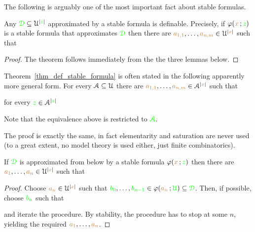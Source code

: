 \documentclass[creche.tex]{subfiles}
\begin{document}
The following is arguably one of the most important fact about stable formulas.

\begin{theorem}\label{thm_def_stable_formula}
Any ${\color{green}\EuScript D}\subseteq\EuScript U^{|{\color{green} z}|}$ approximated by a stable formula is definable.
Precisely, if $\varphi({\color{brown} x}\,;{\color{green} z})$ is a stable formula that approximates ${\color{green}\EuScript D}$ then there are ${\color{brown} a_{1,1}},\dots,{\color{brown} a_{n,m}}\in\EuScript U^{|{\color{brown} x}|}$ such that 

\end{theorem}

\begin{proof}
The theorem follows immediately from the the three lemmas below.
\end{proof}

\begin{remark}
Theorem~\ref{thm_def_stable_formula} is often stated in the following  apparently more general form.
For every $\EuScript A\subseteq\EuScript U$ there are ${\color{brown} a_{1,1}},\dots,{\color{brown} a_{n,m}}\in \EuScript A^{|{\color{brown} x}|}$ such that

\hfill for every ${\color{green} z}\in\EuScript A^{|{\color{green} z}|}$ 

Note that the equivalence above is restricted to ${\color{green}\EuScript A}$.

The proof is exactly the same, in fact elementarity and saturation are never used (to a great extent, no model theory is used either, just finite combinatorics).\QED
\end{remark}


\begin{lemma}
If ${\color{green}\EuScript D}$ is approximated from below by a stable formula $\varphi({\color{brown} x}\,;{\color{green} z})$ then there are ${\color{brown} a_1},\dots,{\color{brown} a_n}\in\EuScript U^{|{\color{brown} x}|}$ such that 


\end{lemma}

\begin{proof}
Choose ${\color{brown} a_n}\in\EuScript U^{|{\color{brown} x}|}$ such that ${\color{green} b_0},\dots,{\color{green} b_{n-1}}\in\varphi({\color{brown} a_n}\,;{\color{green}\EuScript U})\subseteq{\color{green}\EuScript D}$.
Then, if possible, choose ${\color{green} b_n}$ such that


and iterate the procedure.
By stability, the procedure has to stop at some $n$, yielding the required  ${\color{brown} a_1},\dots,{\color{brown} a_n}$.
\end{proof}
\end{document}
